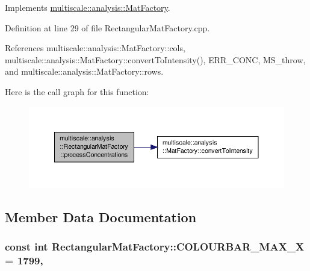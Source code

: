 Implements \hyperlink{classmultiscale_1_1analysis_1_1MatFactory_a0493c87d7b74619a95f14c0e31a3e178}{multiscale\-::analysis\-::\-Mat\-Factory}.



Definition at line 29 of file Rectangular\-Mat\-Factory.\-cpp.



References multiscale\-::analysis\-::\-Mat\-Factory\-::cols, multiscale\-::analysis\-::\-Mat\-Factory\-::convert\-To\-Intensity(), E\-R\-R\-\_\-\-C\-O\-N\-C, M\-S\-\_\-throw, and multiscale\-::analysis\-::\-Mat\-Factory\-::rows.



Here is the call graph for this function\-:
\nopagebreak
\begin{figure}[H]
\begin{center}
\leavevmode
\includegraphics[width=350pt]{classmultiscale_1_1analysis_1_1RectangularMatFactory_a6cc84a4eadbab5046cb6eacba64f5ae4_cgraph}
\end{center}
\end{figure}




\subsection{Member Data Documentation}
\hypertarget{classmultiscale_1_1analysis_1_1RectangularMatFactory_a9a91307705bb2d4cc8e837718ce330a8}{
\subsubsection[{C\-O\-L\-O\-U\-R\-B\-A\-R\-\_\-\-M\-A\-X\-\_\-\-X}]{\setlength{\rightskip}{0pt plus 5cm}const int Rectangular\-Mat\-Factory\-::\-C\-O\-L\-O\-U\-R\-B\-A\-R\-\_\-\-M\-A\-X\-\_\-\-X = 1799\hspace{0.3cm}{\ttfamily [static]}, {\ttfamily [private]}}}\label{classmultiscale_1_1analysis_1_1RectangularMatFactory_a9a91307705bb2d4cc8e837718ce330a8}


